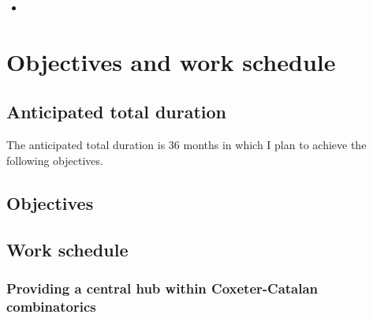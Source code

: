 \documentclass[a4paper,11pt]{article} %
\begin{document}
\begin{itemize}
  \item {}
\end{itemize}

\section{Objectives and work schedule}

\subsection{Anticipated total duration}

The anticipated total duration is 36 months in which I plan to achieve the following objectives.

\subsection{Objectives}

\subsection{Work schedule}\label{sec:work schedule}
%

\subsubsection{Providing a central hub within Coxeter-Catalan combinatorics}
\label{sec:centralhub}
\end{document}
